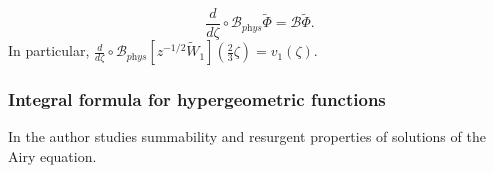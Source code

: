 \documentclass{article}
\begin{document}
\begin{equation}
\frac{d}{d\zeta}\circ\mathcal{B}_{\textit{phys}}\tilde{\Phi}=\mathcal{B}\tilde{\Phi}.
\end{equation}
In particular, $\frac{d}{d\zeta}\circ\mathcal{B}_{\textit{phys}}\left[z^{-1/2}\tilde{W}_{1}\right]\left(\frac{2}{3}\zeta\right)=v_1(\zeta)$. 

%
%
%



\subsubsection{Integral formula for hypergeometric functions}

In \cite{MS16} the author studies summability and resurgent properties of solutions of the Airy equation. 
\end{document}
